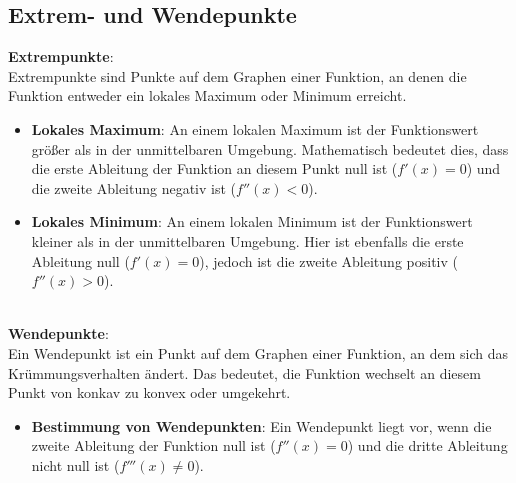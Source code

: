 \subsection{Extrem- und Wendepunkte}
\label{sec:extremundwendepunkte}
\textbf{Extrempunkte}: \\
Extrempunkte sind Punkte auf dem Graphen einer Funktion, 
an denen die Funktion entweder ein lokales Maximum oder Minimum erreicht.
\begin{itemize}
    \item \textbf{Lokales Maximum}: 
        An einem lokalen Maximum ist der Funktionswert größer als in der unmittelbaren Umgebung. Mathematisch bedeutet dies, 
        dass die erste Ableitung der Funktion an diesem Punkt null ist ($f'(x)=0$) und die zweite Ableitung negativ ist ($f''(x)<0$).
    \item \textbf{Lokales Minimum}: 
        An einem lokalen Minimum ist der Funktionswert kleiner als in der unmittelbaren Umgebung. 
        Hier ist ebenfalls die erste Ableitung null ($f'(x)=0$), 
        jedoch ist die zweite Ableitung positiv ($f''(x)>0$).
\end{itemize} 
\
\\
\textbf{Wendepunkte}: \\
Ein Wendepunkt ist ein Punkt auf dem Graphen einer Funktion, 
an dem sich das Krümmungsverhalten ändert. 
Das bedeutet, die Funktion wechselt an diesem Punkt von konkav zu konvex oder umgekehrt.
\begin{itemize}
    \item \textbf{Bestimmung von Wendepunkten}: 
        Ein Wendepunkt liegt vor, 
        wenn die zweite Ableitung der Funktion null ist ($f''(x)=0$) und die dritte Ableitung nicht null ist ($f'''(x)\neq 0$). 
\end{itemize}

